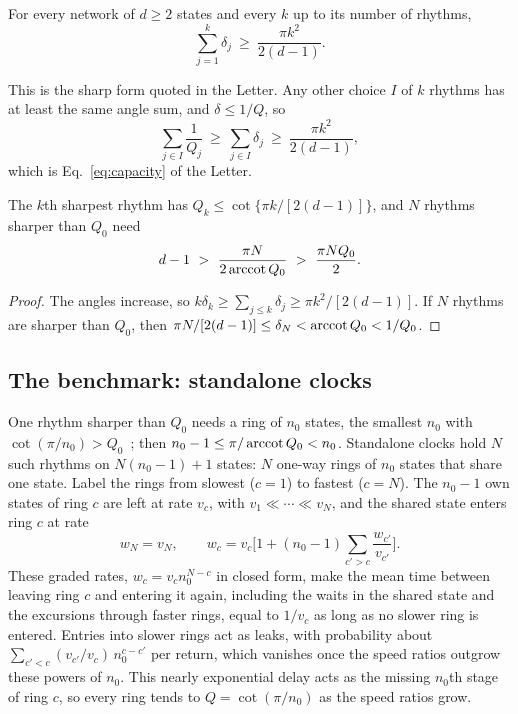 \begin{theorem}\label{thm:counting}
For every network of $d\ge2$ states and every $k$ up to its number of rhythms,
\begin{equation}
\sum_{j=1}^{k}\delta_j\ \ge\ \frac{\pi k^2}{2(d-1)}.
\label{eq:S-counting}
\end{equation}
\end{theorem}

\noindent This is the sharp form quoted in the Letter. Any other choice $I$ of $k$ rhythms has at least the same angle sum, and $\delta\le1/Q$, so
\begin{equation}
\sum_{j\in I}\frac{1}{Q_j}\ \ge\ \sum_{j\in I}\delta_j\ \ge\ \frac{\pi k^2}{2(d-1)},
\label{eq:S-reldamp}
\end{equation}
which is Eq.~\eqref{eq:capacity} of the Letter.

\begin{corollary}\label{cor:count}
The $k$th sharpest rhythm has $Q_k\le\cot\{\pi k/[2(d-1)]\}$, and $N$ rhythms sharper than $Q_0$ need
\begin{equation}
d-1\ >\ \frac{\pi N}{2\arccot Q_0}\ >\ \frac{\pi NQ_0}{2}.
\label{eq:S-cost}
\end{equation}
\end{corollary}

\begin{proof}
The angles increase, so $k\delta_k\ge\sum_{j\le k}\delta_j\ge\pi k^2/[2(d-1)]$. If $N$ rhythms are sharper than $Q_0$, then $\pi N/[2(d-1)]\le\delta_N<\operatorname{arccot} Q_0<1/Q_0$.
\end{proof}

\subsection{The benchmark: standalone clocks}

One rhythm sharper than $Q_0$ needs a ring of $n_0$ states, the smallest $n_0$ with $\cot(\pi/n_0)>Q_0$~\cite{dmitriev1946,karpelevich1951,runnenburg1962,kellogg1978}; then $n_0-1\le\pi/\operatorname{arccot} Q_0<n_0$. Standalone clocks hold $N$ such rhythms on $N(n_0-1)+1$ states: $N$ one-way rings of $n_0$ states that share one state. Label the rings from slowest ($c=1$) to fastest ($c=N$). The $n_0-1$ own states of ring $c$ are left at rate $v_c$, with $v_1\ll\cdots\ll v_N$, and the shared state enters ring $c$ at rate
\begin{equation}
w_N=v_N,\qquad w_c=v_c\Big[1+(n_0-1)\sum_{c'>c}\frac{w_{c'}}{v_{c'}}\Big].
\label{eq:S-entry}
\end{equation}
These graded rates, $w_c=v_cn_0^{N-c}$ in closed form, make the mean time between leaving ring $c$ and entering it again, including the waits in the shared state and the excursions through faster rings, equal to $1/v_c$ as long as no slower ring is entered. Entries into slower rings act as leaks, with probability about $\sum_{c'<c}(v_{c'}/v_c)\,n_0^{c-c'}$ per return, which vanishes once the speed ratios outgrow these powers of $n_0$. This nearly exponential delay acts as the missing $n_0$th stage of ring $c$, so every ring tends to $Q=\cot(\pi/n_0)$ as the speed ratios grow.

